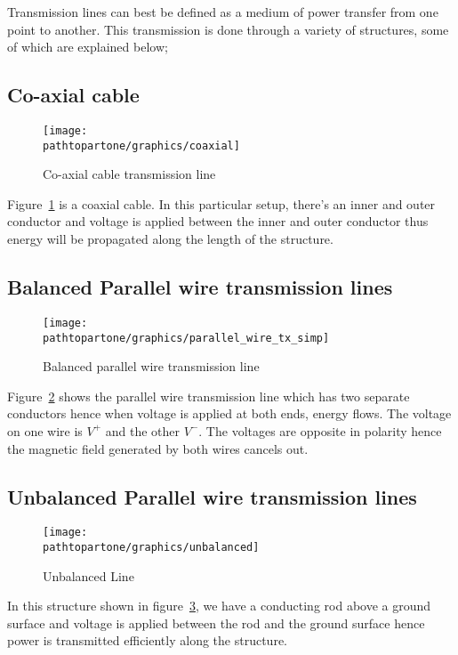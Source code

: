 Transmission lines can best be defined as a medium of power transfer from one point to another. This transmission is done through a variety of structures, some of which are explained below;

\subsection{Co-axial cable}
\begin{figure}[h]
\centering
\texttt{[image: \\pathtopartone/graphics/coaxial]}
\caption{Co-axial cable transmission line}
\label{fig:coaxial}
\end{figure}

Figure~\ref{fig:coaxial} is a coaxial cable. In this particular setup, there’s an inner and outer conductor and voltage is applied between the inner and outer conductor thus energy will be propagated along the length of the structure.

\subsection{Balanced Parallel wire transmission lines}
\begin{figure}[h]
\centering
\texttt{[image: \\pathtopartone/graphics/parallel\_wire\_tx\_simp]}
\caption{Balanced parallel wire transmission line}
\label{fig:twowire}
\end{figure}

Figure~\ref{fig:twowire} shows the parallel wire transmission line which has two separate conductors hence when voltage is applied at both ends, energy flows. The voltage on one wire is $V^+$ and the other $V^-$. The voltages are opposite in polarity hence the magnetic field generated by both wires cancels out.

\subsection{Unbalanced Parallel wire transmission lines}
\begin{figure}[h]
\centering
\texttt{[image: \\pathtopartone/graphics/unbalanced]}
\caption{Unbalanced Line}
\label{fig:unbalanced}
\end{figure}

In this structure shown in figure~\ref{fig:unbalanced}, we have a conducting rod above a ground surface and voltage is applied between the rod and the ground surface hence power is transmitted efficiently along the structure.

